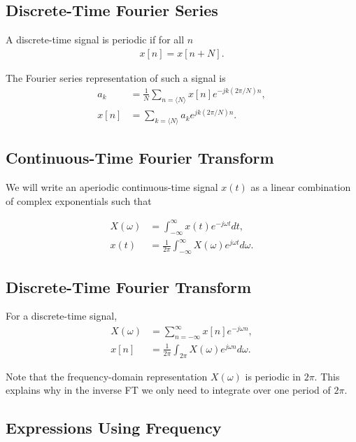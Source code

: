 \documentclass{revtex4-2}
\begin{document}
\subsection{Discrete-Time Fourier Series}

A discrete-time signal is periodic if for all $n$
\begin{align}
    x[n] = x[n + N].
\end{align}

The Fourier series representation of such a signal is
\begin{align}
    a_k &= \frac{1}{N} \sum_{n=\langle N\rangle} x[n] e^{-jk(2\pi/N)n}, \\
    x[n] &= \sum_{k=\langle N\rangle} a_k e^{jk(2\pi/N)n}.
\end{align}


\subsection{Continuous-Time Fourier Transform}

We will write an aperiodic continuous-time signal $x(t)$ as a linear combination of complex exponentials such that

\begin{align}
    X(\omega) &= \int_{-\infty}^\infty x(t)e^{-j\omega t}dt, \\
    x(t) &= \frac{1}{2\pi}\int_{-\infty}^\infty X(\omega) e^{j\omega t}d\omega.
\end{align}

\subsection{Discrete-Time Fourier Transform}

For a discrete-time signal, 
\begin{align}
    X(\omega) &= \sum_{n=-\infty}^\infty x[n] e^{-j\omega n},\\
    x[n] &= \frac{1}{2\pi}\int_{2\pi} X(\omega) e^{j\omega n} d\omega.
\end{align}

Note that the frequency-domain representation $X(\omega)$ is periodic in $2\pi$. This explains why in the inverse FT we only need to integrate over one period of $2\pi$.

\subsection{Expressions Using Frequency}
\end{document}
